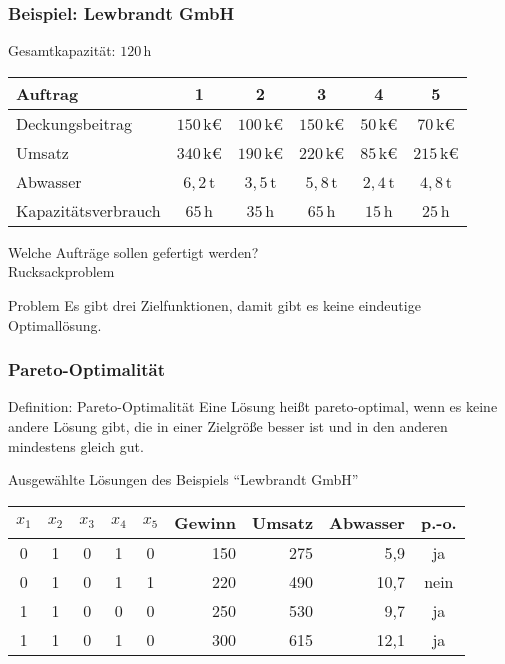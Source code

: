 \begin{frame}
 \frametitle{Beispiel: Lewbrandt GmbH}
 Gesamtkapazität: $120\,$h\\
 \begin{center}\footnotesize
  \begin{tabular}{lccccc}
  \toprule
  \bfseries Auftrag & \bfseries 1 & \bfseries 2 & \bfseries 3 & \bfseries 4 & \bfseries 5 \\
  \midrule
  Deckungsbeitrag & $150\,$k€ & $100\,$k€ & $150\,$k€ & $50\,$k€ & $70\,$k€\\
  Umsatz & $340\,$k€ & $190\,$k€ & $220\,$k€ & $85\,$k€ & $215\,$k€ \\
  Abwasser & $6,2\,$t & $3,5\,$t & $5,8\,$t & $2,4\,$t & $4,8\,$t \\
  Kapazitätsverbrauch &  $65\,$h & $35\,$h & $65\,$h & $15\,$h & $25\,$h\\
  \bottomrule
  \end{tabular}
 \end{center}
 
 Welche Aufträge sollen gefertigt werden? \\\textrightarrow{} Rucksackproblem
 
 \begin{block}{Problem}
  Es gibt drei Zielfunktionen, damit gibt es keine eindeutige Optimallösung.
 \end{block}
\end{frame}

\begin{frame}
 \frametitle{Pareto-Optimalität}
 \begin{block}{Definition: Pareto-Optimalität}
  Eine Lösung heißt pareto-optimal, wenn es keine andere Lösung gibt, die in einer Zielgröße besser ist und in den anderen mindestens gleich gut. 
 \end{block}
 
 \begin{block}{Ausgewählte Lösungen des Beispiels "`Lewbrandt GmbH"'}
  \footnotesize
 \centering
 \begin{tabular}{*{5}{c}rrrc}
  \toprule
  $x_1$ & $x_2$ & $x_3$ & $x_4$ & $x_5$ & \scriptsize Gewinn & \scriptsize Umsatz & \scriptsize Abwasser & p.-o. \\
  \midrule
  0&	1&	0&	1&	0&	150&	275&	5,9&	ja\\
  \alert{0}&	\alert{1}&	\alert{0}&	\alert{1}&	\alert{1}&	\alert{220}&	\alert{490}&	\alert{10,7}&	\alert{nein}\\
  1&	1&	0&	0&	0&	250&	530&	9,7&	ja\\
  1&	1&	0&	1&	0&	300&	615&	12,1&	ja\\
  \bottomrule
 \end{tabular}
 \end{block}

\end{frame}

